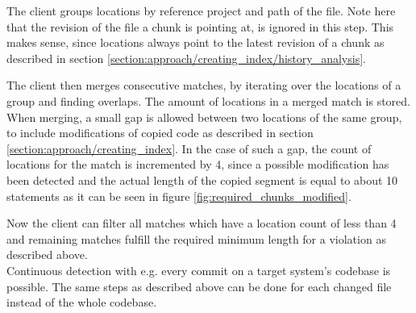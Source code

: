 The client groups locations by reference project and path of the file.
Note here that the revision of the file a chunk is pointing at, is ignored in this step.
This makes sense, since locations always point to the latest revision of a chunk as described in section \ref{section:approach/creating_index/history_analysis}.

The client then merges consecutive matches, by iterating over the locations of a group and finding overlaps.
The amount of locations in a merged match is stored.
When merging, a small gap is allowed between two locations of the same group, to include modifications of copied code as described in section \ref{section:approach/creating_index}.
In the case of such a gap, the count of locations for the match is incremented by 4, since a possible modification has been detected and the actual length of the copied segment is equal to about 10 statements as it can be seen in figure \ref{fig:required_chunks_modified}.

Now the client can filter all matches which have a location count of less than 4 and remaining matches fulfill the required minimum length for a violation as described above.
\\
Continuous detection with e.g. every commit on a target system's codebase is possible.
The same steps as described above can be done for each changed file instead of the whole codebase.